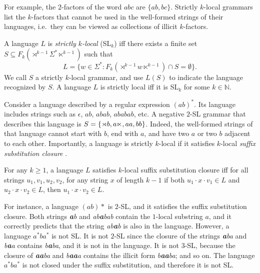 For example, the $2$-factors of the word $abc$ are $\{ab, bc\}$.
Strictly $k$-local grammars list the $k$-factors that cannot be used in the well-formed strings of their languages, i.e.\ they can be viewed as collections of illicit $k$-factors.

\begin{definition}
A language $L$ is \emph{strictly $k$-local} (SL$_k$) iff there exists a finite set $S \subseteq F_k (\rtimes^{k-1} \Sigma^* \ltimes^{k-1})$ such that
\[
L = \{ w \in \Sigma^*: F_k(\rtimes^{k-1} w \ltimes^{k-1}) \cap S = \emptyset \}.
\]
We call $S$ a strictly $k$-local grammar, and use $L(S)$  to indicate the language recognized by $S$.
A language $L$ is strictly local iff it is SL$_k$ for some $k \in \mathbb{N}$.
\end{definition}

Consider a language described by a regular expression $(ab)^{*}$.
Its language includes strings such as $\epsilon$, $ab$, $abab$, $ababab$, etc.
A negative $2$-SL grammar that describes this language is $S = \{\rtimes b, a\ltimes, aa, bb\}$.
Indeed, the well-formed strings of that language cannot start with $b$, end with $a$, and have two $a$ or two $b$ adjacent to each other.
Importantly, a language is strictly $k$-local if it satisfies $k$-local \emph{suffix substitution closure} \citep{RogersPullum2011}.

\begin{definition}
\label{suffsubclosure}
For any $k \geq 1$, a language $L$ satisfies  $k$-local suffix substitution closure iff for all strings $u_1, v_1, u_2, v_2$, for any string $x$ of length $k - 1$ if both $u_1 \cdot x \cdot v_1 \in L$ and $u_2 \cdot x \cdot v_2 \in L$, then $u_1 \cdot x \cdot v_2 \in L$.
\end{definition}

For instance, a language $(ab)*$ is $2$-SL, and it satisfies the suffix substitution closure.
Both strings \emph{\textbf{a}b} and \emph{ab\textbf{a}bab} contain the $1$-local substring $a$, and it correctly predicts that the string \emph{ab\textbf{a}b} is also in the language.
However, a language $a^*ba^*$ is not SL.
It is not $2$-SL since the closure of the strings \emph{\textbf{a}ba} and  \emph{b\textbf{a}a} contains \emph{b\textbf{a}ba}, and it is not in the language.
It is not $3$-SL, because the closure of \emph{\textbf{aa}ba} and \emph{b\textbf{aa}a} contains the illicit form \emph{b\textbf{aa}ba}; and so on.
The language $a^*ba^*$ is not closed under the suffix substitution, and therefore it is not SL.


